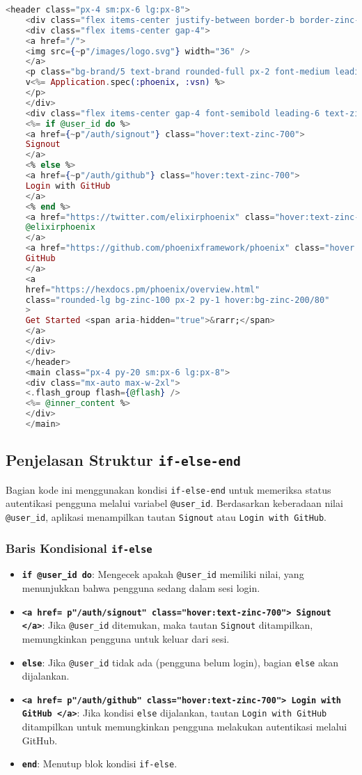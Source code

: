 \begin{lstlisting}[language=Elixir]
	<header class="px-4 sm:px-6 lg:px-8">
	<div class="flex items-center justify-between border-b border-zinc-100 py-3 text-sm">
	<div class="flex items-center gap-4">
	<a href="/">
	<img src={~p"/images/logo.svg"} width="36" />
	</a>
	<p class="bg-brand/5 text-brand rounded-full px-2 font-medium leading-6">
	v<%= Application.spec(:phoenix, :vsn) %>
	</p>
	</div>
	<div class="flex items-center gap-4 font-semibold leading-6 text-zinc-900">
	<%= if @user_id do %>
	<a href={~p"/auth/signout"} class="hover:text-zinc-700">
	Signout
	</a> 
	<% else %>
	<a href={~p"/auth/github"} class="hover:text-zinc-700">
	Login with GitHub
	</a>
	<% end %> 
	<a href="https://twitter.com/elixirphoenix" class="hover:text-zinc-700">
	@elixirphoenix
	</a>
	<a href="https://github.com/phoenixframework/phoenix" class="hover:text-zinc-700">
	GitHub
	</a>
	<a
	href="https://hexdocs.pm/phoenix/overview.html"
	class="rounded-lg bg-zinc-100 px-2 py-1 hover:bg-zinc-200/80"
	>
	Get Started <span aria-hidden="true">&rarr;</span>
	</a>
	</div>
	</div>
	</header>
	<main class="px-4 py-20 sm:px-6 lg:px-8">
	<div class="mx-auto max-w-2xl">
	<.flash_group flash={@flash} />
	<%= @inner_content %>
	</div>
	</main>
\end{lstlisting}

\subsection{Penjelasan Struktur \texttt{if-else-end}}
Bagian kode ini menggunakan kondisi \texttt{if-else-end} untuk memeriksa status autentikasi pengguna melalui variabel \texttt{@user\_id}. Berdasarkan keberadaan nilai \texttt{@user\_id}, aplikasi menampilkan tautan \texttt{Signout} atau \texttt{Login with GitHub}.

\subsubsection{Baris Kondisional \texttt{if-else}}
\begin{itemize}
	\item \textbf{\texttt{if @user\_id do}}: Mengecek apakah \texttt{@user\_id} memiliki nilai, yang menunjukkan bahwa pengguna sedang dalam sesi login.
	\item \textbf{\texttt{<a href={~p"/auth/signout"} class="hover:text-zinc-700"> Signout </a>}}: Jika \texttt{@user\_id} ditemukan, maka tautan \texttt{Signout} ditampilkan, memungkinkan pengguna untuk keluar dari sesi.
	\item \textbf{\texttt{else}}: Jika \texttt{@user\_id} tidak ada (pengguna belum login), bagian \texttt{else} akan dijalankan.
	\item \textbf{\texttt{<a href={~p"/auth/github"} class="hover:text-zinc-700"> Login with GitHub </a>}}: Jika kondisi \texttt{else} dijalankan, tautan \texttt{Login with GitHub} ditampilkan untuk memungkinkan pengguna melakukan autentikasi melalui GitHub.
	\item \textbf{\texttt{end}}: Menutup blok kondisi \texttt{if-else}.
\end{itemize}

